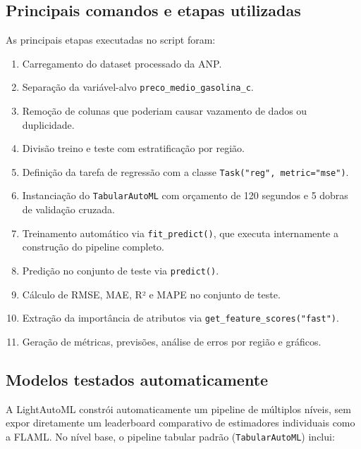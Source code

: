 \documentclass[11pt, a4paper, oneside]{article}
\begin{document}
\subsection{Principais comandos e etapas utilizadas}
\label{sec:lama-etapas}

As principais etapas executadas no script foram:

\begin{enumerate}[leftmargin=1.5cm, itemsep=4pt]
  \item Carregamento do dataset processado da ANP.
  \item Separação da variável-alvo \texttt{preco\_medio\_gasolina\_c}.
  \item Remoção de colunas que poderiam causar vazamento de dados ou duplicidade.
  \item Divisão treino e teste com estratificação por região.
  \item Definição da tarefa de regressão com a classe \texttt{Task("reg", metric="mse")}.
  \item Instanciação do \texttt{TabularAutoML} com orçamento de 120 segundos e 5 dobras de validação cruzada.
  \item Treinamento automático via \texttt{fit\_predict()}, que executa internamente a construção do pipeline completo.
  \item Predição no conjunto de teste via \texttt{predict()}.
  \item Cálculo de RMSE, MAE, R² e MAPE no conjunto de teste.
  \item Extração da importância de atributos via \texttt{get\_feature\_scores("fast")}.
  \item Geração de métricas, previsões, análise de erros por região e gráficos.
\end{enumerate}

\subsection{Modelos testados automaticamente}
\label{sec:lama-modelos}

A LightAutoML constrói automaticamente um pipeline de múltiplos níveis, sem expor
diretamente um leaderboard comparativo de estimadores individuais como a FLAML. No
nível base, o pipeline tabular padrão (\texttt{TabularAutoML}) inclui:
\end{document}
